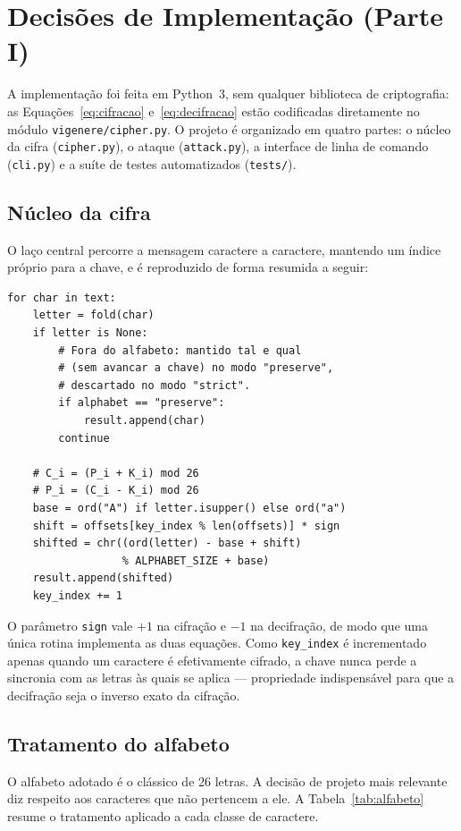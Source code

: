 \documentclass[conference]{IEEEtran}
\begin{document}
\section{Decisões de Implementação (Parte I)}
\label{sec:implementacao}
A implementação foi feita em Python~3, sem qualquer biblioteca de
criptografia: as Equações~\eqref{eq:cifracao} e~\eqref{eq:decifracao} estão
codificadas diretamente no módulo \texttt{vigenere/cipher.py}. O projeto é
organizado em quatro partes: o núcleo da cifra (\texttt{cipher.py}), o ataque
(\texttt{attack.py}), a interface de linha de comando (\texttt{cli.py}) e a
suíte de testes automatizados (\texttt{tests/}).

\subsection{Núcleo da cifra}
O laço central percorre a mensagem caractere a caractere, mantendo um índice
próprio para a chave, e é reproduzido de forma resumida a seguir:

\begin{lstlisting}
for char in text:
    letter = fold(char)
    if letter is None:
        # Fora do alfabeto: mantido tal e qual
        # (sem avancar a chave) no modo "preserve",
        # descartado no modo "strict".
        if alphabet == "preserve":
            result.append(char)
        continue

    # C_i = (P_i + K_i) mod 26
    # P_i = (C_i - K_i) mod 26
    base = ord("A") if letter.isupper() else ord("a")
    shift = offsets[key_index % len(offsets)] * sign
    shifted = chr((ord(letter) - base + shift)
                  % ALPHABET_SIZE + base)
    result.append(shifted)
    key_index += 1
\end{lstlisting}

O parâmetro \texttt{sign} vale $+1$ na cifração e $-1$ na decifração, de modo
que uma única rotina implementa as duas equações. Como \texttt{key\_index} é
incrementado apenas quando um caractere é efetivamente cifrado, a chave nunca
perde a sincronia com as letras às quais se aplica --- propriedade
indispensável para que a decifração seja o inverso exato da cifração.

\subsection{Tratamento do alfabeto}
O alfabeto adotado é o clássico de 26 letras. A decisão de projeto mais
relevante diz respeito aos caracteres que não pertencem a ele. A
Tabela~\ref{tab:alfabeto} resume o tratamento aplicado a cada classe de
caractere.
\end{document}
